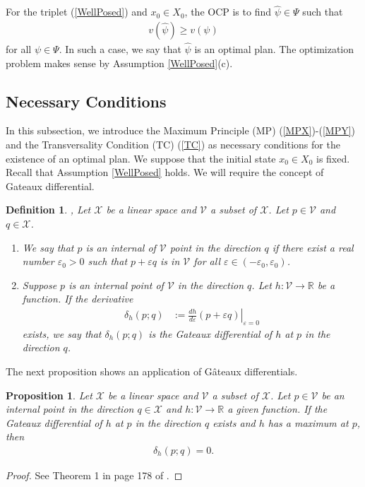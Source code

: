 \documentclass[3p]{elsarticle}
\newcommand{\rz}{\mathbb R}
\newtheorem{prop}[thm]{Proposition}
\newtheorem{defi}[thm]{Definition}
\begin{document}
	For the triplet (\ref{WellPosed}) and $x_0\in X_0$, the OCP is to find $\hat\psi\in\Psi$ such that 
	\begin{align*}
	v(\hat{\psi})\ge v(\psi)
	\end{align*} 
	for all $\psi\in\Psi$. In such a case, we say that $\hat{\psi}$ is an optimal plan. The optimization problem makes sense by Assumption \ref{WellPosed}(c).
	
	
	
	
	
	
	
	\subsection{Necessary Conditions}\label{NECCON}
	
	
	In this subsection, we introduce the Maximum Principle (MP)  (\ref{MPX})-(\ref{MPY}) and the Transversality Condition (TC) (\ref{TC}) as necessary conditions for the existence of an optimal plan. 
	We suppose that the initial state $x_0\in X_0$ is fixed. Recall that Assumption \ref{WellPosed} holds. We will require the concept of Gateaux differential.
	
	\begin{defi}{\cite[pp.2-4]{Flemming},\cite[p.171]{Lue}}
		Let $\mathcal{X}$ be a linear space and $\mathcal{V}$ a subset of $\mathcal X$. Let $p\in\mathcal V$ and $q\in\mathcal X$.
		\begin{enumerate}
			\item[(a)]  We say that $p$ is an internal of $\mathcal V$  point in the direction $q$ if there exist a real number $\varepsilon_0>0$ such that 
			$
			p+\varepsilon q
			$ is in $\mathcal V$
			for all $\varepsilon\in(-\varepsilon_0,\varepsilon_0)$.
			\item[(b)]Suppose $p$ is an internal point of $\mathcal V$ in the direction $q$. Let $h :\mathcal V\to\rz$ be a function. If the derivative
			\begin{align*}
			\delta_{h}(p;q)&:=\left.\frac{d h}{d\varepsilon}(p+\varepsilon q)\right|_{\varepsilon=0}
			\end{align*}
			exists, we say that $\delta_{h}(p;q)$ is the Gateaux differential of $h$ at $p$ in the direction $q$.
		\end{enumerate}
	\end{defi}
	
	The next proposition shows an application of G\^ ateaux differentials.
	
	\begin{prop}\label{GD}
		Let $\mathcal{X}$ be a linear space and $\mathcal{V}$ a subset of $\mathcal X$. Let $p\in\mathcal V$ be an internal point in the direction $q\in\mathcal X$ and $h:\mathcal V\to\rz$ a given function. If the Gateaux differential of $h$ at $p$ in the  direction $q$ exists and $h$ has a maximum at $p$, then 
		\begin{align*}
		\delta_h(p;q)=0.
		\end{align*}
	\end{prop}
	\begin{proof}
		See Theorem 1 in page 178 of \cite{Lue}.
	\end{proof}
	
\end{document}
